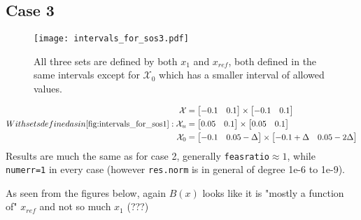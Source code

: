 
\subsection{Case 3}\label{case3}
\begin{figure}[htbp]
\centering\texttt{[image: intervals\_for\_sos3.pdf]}
\caption{All three sets are defined by both $x_1$ and $x_{ref}$, both defined in the same intervals except for $\mathcal{X}_0$ which has a smaller interval of allowed values.}
\label{fig:intervals_for_sos3}
\end{figure}
\begin{subequations}\label{eq:sets_case3}
With sets defined as in \autoref{fig:intervals_for_sos1}:
\begin{align}
	\mathcal{X} &= \begin{bmatrix} -0.1 & 0.1\end{bmatrix} \times \begin{bmatrix} -0.1 & 0.1\end{bmatrix}\\
	\mathcal{X}_u &= \begin{bmatrix} 0.05 & 0.1\end{bmatrix} \times \begin{bmatrix} 0.05 & 0.1\end{bmatrix}\\
	\mathcal{X}_0 &= \begin{bmatrix} -0.1 & 0.05-\Delta\end{bmatrix} \times \begin{bmatrix} -0.1+\Delta & 0.05-2\Delta\end{bmatrix}
\end{align}
\end{subequations}
Results are much the same as for case 2, generally \texttt{feasratio}$\approx 1$, while \texttt{numerr=1} in every case (however \texttt{res.norm} is in general of degree 1e-6 to 1e-9).

As seen from the figures below, again $B(x)$ looks like it is "mostly a function of" $x_{ref}$ and not so much $x_1$ (???)

